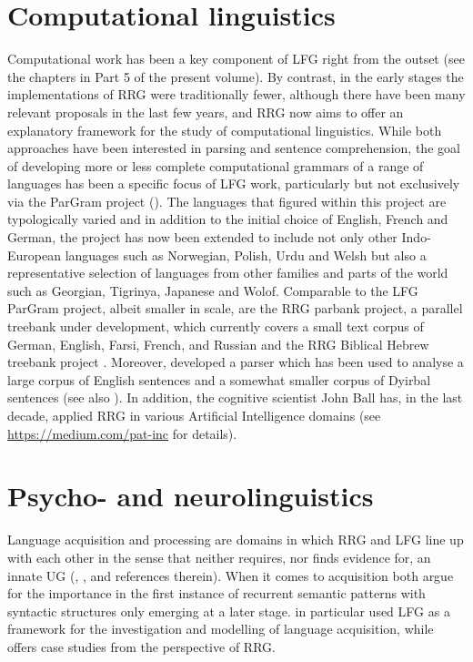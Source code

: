 \documentclass[output=paper,hidelinks]{langscibook}
\begin{document}
\section{Computational linguistics}
\label{sec:RRG:5}

Computational work has been a key component of LFG right from the outset (see the chapters in Part 5 of the present volume). By contrast, in the early stages the implementations of RRG were traditionally fewer, although there have been many relevant proposals in the last few years, and RRG now aims to offer an explanatory framework for the study of computational linguistics. While both approaches have been interested in parsing and sentence comprehension, the goal of developing more or less complete computational grammars of a range of languages has been a specific focus of LFG work, particularly but not exclusively via the ParGram project ().  The languages that figured within this project are typologically varied and in addition to the initial choice of English, French and German, the project has now been extended to include not only other Indo-European languages such as Norwegian, Polish, Urdu and Welsh but also a representative selection of languages from other families and parts of the world such as Georgian, Tigrinya, Japanese and Wolof. Comparable to the LFG ParGram project, albeit smaller in scale, are the RRG parbank project, a parallel treebank under development, which currently covers a small text corpus of German, English, Farsi, French, and Russian \citep{Arps2021} and the RRG Biblical Hebrew treebank project \citep{CanyHojgaaard2021}. Moreover, \citet{Guest2008} developed a parser which has been used to analyse a large corpus of English sentences and a somewhat smaller corpus of Dyirbal sentences (see also \citealt{Nolan2022}). In addition, the cognitive scientist John Ball has, in the last decade, applied RRG in various Artificial Intelligence domains (see \url{https://medium.com/pat-inc} for details).

\section{Psycho- and neurolinguistics}
\label{sec:RRG:6}

Language acquisition and processing are domains in which RRG and LFG line up with each other in the sense that neither requires, nor finds evidence for, an innate UG (\citealt{Pinker1989}, \citealt{VanValin2002}, \citealt{Weist2022} and references therein). When it comes to acquisition both argue for the importance in the first instance of recurrent semantic patterns with syntactic structures only emerging at a later stage. \citet{Pinker1982,Pinker1989} in particular used LFG as a framework for the investigation and modelling of language acquisition, while \citet{VanValin1994,VanValin1998,VanValin2001,VanValin2002} offers case studies from the perspective of RRG.
\end{document}

